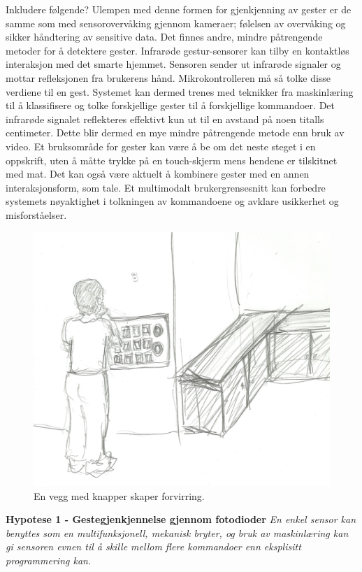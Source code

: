 {\color{blue}Inkludere følgende?\newline
Ulempen med denne formen for gjenkjenning av gester er de samme som med sensorovervåking gjennom kameraer; følelsen av overvåking og sikker håndtering av sensitive data. Det finnes andre, mindre påtrengende metoder for å detektere gester. Infrarøde gestur-sensorer kan tilby en kontaktløs interaksjon med det smarte hjemmet. Sensoren sender ut infrarøde signaler og mottar refleksjonen fra brukerens hånd. Mikrokontrolleren må så tolke disse verdiene til en gest. Systemet kan dermed trenes med teknikker fra maskinlæring til å klassifisere og tolke forskjellige gester til å forskjellige kommandoer. Det infrarøde signalet reflekteres effektivt kun ut til en avstand på noen titalls centimeter. Dette blir dermed en mye mindre påtrengende metode enn bruk av video. Et bruksområde for gester kan være å be om det neste steget i en oppskrift, uten å måtte trykke på en touch-skjerm mens hendene er tilskitnet med mat. Det kan også være aktuelt å kombinere gester med en annen interaksjonsform, som tale. Et multimodalt brukergrensesnitt kan forbedre systemets nøyaktighet i tolkningen av kommandoene og avklare usikkerhet og misforståelser.}

\begin{figure}
\centering
\includegraphics[scale=0.1]{fig/buttons}
\caption{En vegg med knapper skaper forvirring.}
\label{fig:panel}
\end{figure}
\textbf{Hypotese 1 - Gestegjenkjennelse gjennom fotodioder}\newline
\emph{En enkel sensor kan benyttes som en multifunksjonell, mekanisk bryter, og bruk av maskinlæring kan gi sensoren evnen til å skille mellom flere kommandoer enn eksplisitt programmering kan.}\newline

